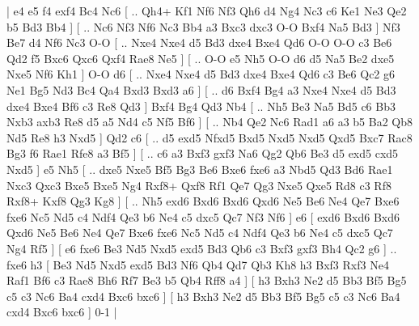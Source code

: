 \makegametitle 
|   e4   e5    f4   exf4    Bc4   Nc6 [ .. Qh4+  Kf1 Nf6  Nf3 Qh6  d4 Ng4  Nc3 c6  Ke1 Ne3  Qe2 b5  Bd3 Bb4   ]  [ .. Nc6  Nf3 Nf6  Nc3 Bb4  a3 Bxc3  dxc3 O-O  Bxf4 Na5  Bd3   ]  Nf3   Be7    d4   Nf6    Nc3   O-O [ .. Nxe4  Nxe4 d5  Bd3 dxe4  Bxe4 Qd6  O-O O-O  c3 Be6  Qd2 f5  Bxc6 Qxc6  Qxf4 Rae8  Ne5   ]  [ .. O-O  e5 Nh5  O-O d6  d5 Na5  Be2 dxe5  Nxe5 Nf6  Kh1   ]  O-O   d6 [ .. Nxe4  Nxe4 d5  Bd3 dxe4  Bxe4 Qd6  c3 Be6  Qc2 g6  Ne1 Bg5  Nd3 Bc4  Qa4 Bxd3  Bxd3 a6   ]  [ .. d6  Bxf4 Bg4  a3 Nxe4  Nxe4 d5  Bd3 dxe4  Bxe4 Bf6  c3 Re8  Qd3   ]  Bxf4   Bg4    Qd3   Nb4 [ .. Nh5  Be3 Na5  Bd5 c6  Bb3 Nxb3  axb3 Re8  d5 a5  Nd4 c5  Nf5 Bf6   ]  [ .. Nb4  Qe2 Nc6  Rad1 a6  a3 b5  Ba2 Qb8  Nd5 Re8  h3 Nxd5   ]  Qd2   c6 [ .. d5  exd5 Nfxd5  Bxd5 Nxd5  Nxd5 Qxd5  Bxc7 Rac8  Bg3 f6  Rae1 Rfe8  a3 Bf5   ]  [ .. c6  a3 Bxf3  gxf3 Na6  Qg2 Qb6  Be3 d5  exd5 cxd5  Nxd5   ]  e5   Nh5 [ .. dxe5  Nxe5 Bf5  Bg3 Be6  Bxe6 fxe6  a3 Nbd5  Qd3 Bd6  Rae1 Nxc3  Qxc3 Bxe5  Bxe5 Ng4  Rxf8+ Qxf8  Rf1 Qe7  Qg3 Nxe5  Qxe5 Rd8  c3 Rf8  Rxf8+ Kxf8  Qg3 Kg8   ]  [ .. Nh5  exd6 Bxd6  Bxd6 Qxd6  Ne5 Be6  Ne4 Qe7  Bxe6 fxe6  Nc5 Nd5  c4 Ndf4  Qe3 b6  Ne4 c5  dxc5 Qc7  Nf3 Nf6   ]  e6 [  exd6 Bxd6  Bxd6 Qxd6  Ne5 Be6  Ne4 Qe7  Bxe6 fxe6  Nc5 Nd5  c4 Ndf4  Qe3 b6  Ne4 c5  dxc5 Qc7  Ng4 Rf5   ]  [  e6 fxe6  Be3 Nd5  Nxd5 exd5  Bd3 Qb6  c3 Bxf3  gxf3 Bh4  Qc2 g6   ] .. fxe6    h3 [  Be3 Nd5  Nxd5 exd5  Bd3 Nf6  Qb4 Qd7  Qb3 Kh8  h3 Bxf3  Rxf3 Ne4  Raf1 Bf6  c3 Rae8  Bh6 Rf7  Be3 b5  Qb4 Rff8  a4   ]  [  h3 Bxh3  Ne2 d5  Bb3 Bf5  Bg5 c5  c3 Nc6  Ba4 cxd4  Bxc6 bxc6   ]  [  h3 Bxh3  Ne2 d5  Bb3 Bf5  Bg5 c5  c3 Nc6  Ba4 cxd4  Bxc6 bxc6   ] 0-1  |
